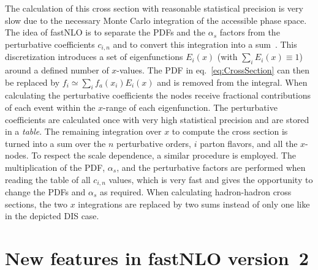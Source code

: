 \documentclass{DISproc}
\begin{document}
The calculation of this cross section with reasonable statistical
precision is very slow due to the necessary Monte Carlo integration of
the accessible phase space.  The idea of fastNLO is to separate
the PDFs and the $\alpha_s$ factors from the perturbative coefficients
$c_{i,n}$ and to convert this integration into a
sum~\cite{Pascaud:1994vx,Wobisch:00}.  This discretization introduces
a set of eigenfunctions $E_i(x)$ (with $\sum_i E_i(x) \equiv 1$) around
a defined number of $x$-values.  The PDF in eq.~\ref{eq:CrossSection}
can then be replaced by $f_i \simeq \sum_i f_a(x_i) E_i(x)$ and is
removed from the integral.  When calculating the perturbative
coefficients the nodes receive fractional contributions of each event
within the $x$-range of each eigenfunction. The perturbative
coefficients are calculated once with very high statistical precision
and are stored in a \emph{table}.  The remaining integration over $x$
to compute the cross section is turned into a sum over the $n$
perturbative orders, $i$ parton flavors, and all the $x$-nodes.  To
respect the scale dependence, a similar procedure is employed.
The multiplication of the PDF, $\alpha_s$,
and the perturbative factors are performed when reading the table of
all $c_{i,n}$ values, which is very fast and gives the opportunity to
change the PDFs and $\alpha_s$ as required.  When calculating
hadron-hadron cross sections, the two $x$ integrations %
are replaced by two sums instead of only one like in the
depicted DIS case.



\section{New features in fastNLO version~2}
\end{document}
